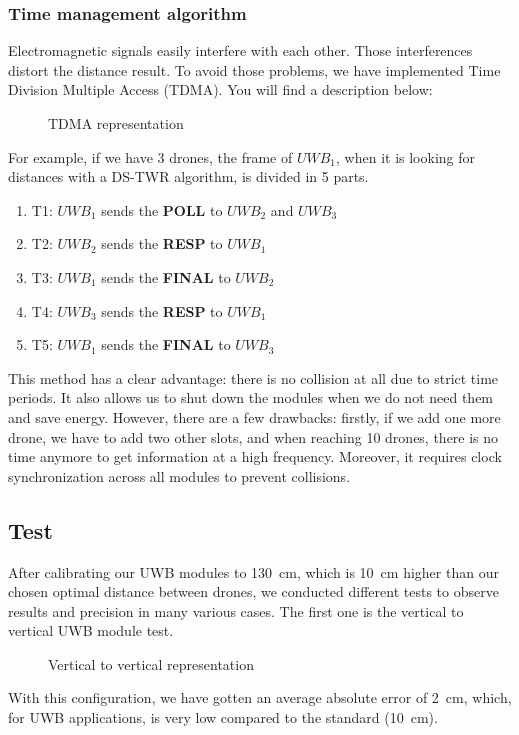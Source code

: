 \documentclass[conference]{IEEEtran}
\begin{document}
\subsubsection{Time management algorithm}
Electromagnetic signals easily interfere with each other. Those interferences
distort the distance result. To avoid those problems, we have implemented
Time Division Multiple Access (TDMA). You will find a description below:

\begin{figure}[H]
    \centering
    \resizebox{0.8\linewidth}{!}{\TDMA}
    \caption{TDMA representation}
    \label{fig:TDMA}
\end{figure}

For example, if we have 3 drones, the frame of $UWB_1$, when it is looking for
distances with a DS-TWR algorithm, is divided in 5 parts.
\begin{enumerate}
    \item T1: $UWB_1$ sends the \textbf{POLL} to $UWB_2$ and $UWB_3$
    \item T2: $UWB_2$ sends the \textbf{RESP} to $UWB_1$
    \item T3: $UWB_1$ sends the \textbf{FINAL} to $UWB_2$
    \item T4: $UWB_3$ sends the \textbf{RESP} to $UWB_1$
    \item T5: $UWB_1$ sends the \textbf{FINAL} to $UWB_3$
\end{enumerate}

\noindent This method has a clear advantage: there is no collision at all due
to strict time periods. It also allows us to shut down the modules when we do
not need them and save energy. However, there are a few drawbacks: firstly,
if we add one more drone, we have to add two other slots, and when reaching
10 drones, there is no time anymore to get information at a high frequency.
Moreover, it requires clock synchronization across all modules to prevent collisions.

\subsection{Test}
After calibrating our UWB modules to 130~cm, which is 10~cm higher than our chosen
optimal distance between drones, we conducted different tests to observe
results and precision in many various cases.
The first one is the vertical to vertical UWB module test.
\begin{figure}[H]
    \centering
    \resizebox{0.8\linewidth}{!}{\FtFVertical}
    \caption{Vertical to vertical representation}
    \label{fig:FtFVertical}
\end{figure}
With this configuration, we have gotten an average absolute error of 2~cm,
which, for UWB applications, is very low compared to the standard (10~cm).
\end{document}
